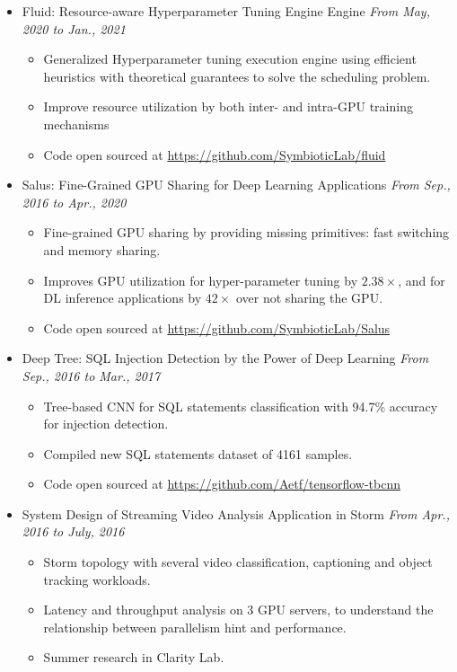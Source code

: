 \documentclass[letterpaper,11pt]{article}
\begin{document}
\begin{itemize}
    \item Fluid: Resource-aware Hyperparameter Tuning Engine
    Engine \hfill \textit{From May, 2020 to Jan., 2021}
    \begin{itemize}
        \item Generalized Hyperparameter tuning execution engine using efficient
        heuristics with theoretical guarantees to solve the scheduling problem.
        \item Improve resource utilization by both inter- and intra-GPU training
        mechanisms
        \item Code open sourced at \url{https://github.com/SymbioticLab/fluid}
    \end{itemize}
    \item Salus: Fine-Grained GPU Sharing for Deep Learning Applications \hfill \textit{From Sep., 2016 to Apr., 2020}
    \begin{itemize}
        \item Fine-grained GPU sharing by providing missing primitives: fast 
switching and memory sharing.
        \item Improves GPU utilization for hyper-parameter tuning by $2.38\times$, and for DL 
inference applications by $42\times$ over not sharing the GPU.
        \item Code open sourced at \url{https://github.com/SymbioticLab/Salus}
    \end{itemize}

    \item Deep Tree: SQL Injection Detection by the Power of Deep Learning \hfill \textit{From Sep., 2016 to Mar., 2017}
    \begin{itemize}
        \item Tree-based CNN for SQL statements classification with 94.7\% accuracy for injection 
detection.
        \item Compiled new SQL statements dataset of 4161 samples.
        \item Code open sourced at \url{https://github.com/Aetf/tensorflow-tbcnn}
    \end{itemize}

    \item System Design of Streaming Video Analysis Application in Storm \hfill \textit{From Apr., 2016 to July, 2016}
    \begin{itemize}
        \item Storm topology with several video classification, captioning and object tracking 
workloads.
        \item Latency and throughput analysis on 3 GPU servers, to understand the relationship 
between parallelism hint and performance.
        \item Summer research in Clarity Lab.
    \end{itemize}


\end{itemize}
\end{document}

